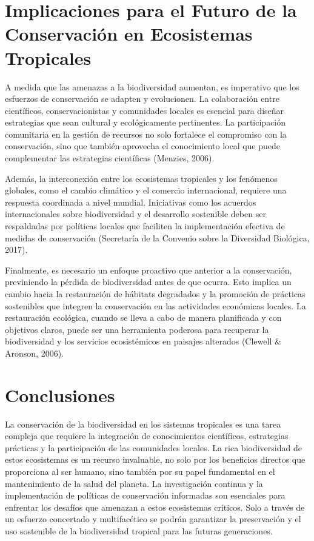 \documentclass[
  letterpaper,
  DIV=11,
  numbers=noendperiod,
  oneside]{scrreprt}
\begin{document}
\section{Implicaciones para el Futuro de la Conservación en Ecosistemas
Tropicales}\label{implicaciones-para-el-futuro-de-la-conservaciuxf3n-en-ecosistemas-tropicales}

A medida que las amenazas a la biodiversidad aumentan, es imperativo que
los esfuerzos de conservación se adapten y evolucionen. La colaboración
entre científicos, conservacionistas y comunidades locales es esencial
para diseñar estrategias que sean cultural y ecológicamente pertinentes.
La participación comunitaria en la gestión de recursos no solo fortalece
el compromiso con la conservación, sino que también aprovecha el
conocimiento local que puede complementar las estrategias científicas
(Menzies, 2006).

Además, la interconexión entre los ecosistemas tropicales y los
fenómenos globales, como el cambio climático y el comercio
internacional, requiere una respuesta coordinada a nivel mundial.
Iniciativas como los acuerdos internacionales sobre biodiversidad y el
desarrollo sostenible deben ser respaldadas por políticas locales que
faciliten la implementación efectiva de medidas de conservación
(Secretaría de la Convenio sobre la Diversidad Biológica, 2017).

Finalmente, es necesario un enfoque proactivo que anterior a la
conservación, previniendo la pérdida de biodiversidad antes de que
ocurra. Esto implica un cambio hacia la restauración de hábitats
degradados y la promoción de prácticas sostenibles que integren la
conservación en las actividades económicas locales. La restauración
ecológica, cuando se lleva a cabo de manera planificada y con objetivos
claros, puede ser una herramienta poderosa para recuperar la
biodiversidad y los servicios ecosistémicos en paisajes alterados
(Clewell \& Aronson, 2006).

\section{Conclusiones}\label{conclusiones-1}

La conservación de la biodiversidad en los sistemas tropicales es una
tarea compleja que requiere la integración de conocimientos científicos,
estrategias prácticas y la participación de las comunidades locales. La
rica biodiversidad de estos ecosistemas es un recurso invaluable, no
solo por los beneficios directos que proporciona al ser humano, sino
también por su papel fundamental en el mantenimiento de la salud del
planeta. La investigación continua y la implementación de políticas de
conservación informadas son esenciales para enfrentar los desafíos que
amenazan a estos ecosistemas críticos. Solo a través de un esfuerzo
concertado y multifacético se podrán garantizar la preservación y el uso
sostenible de la biodiversidad tropical para las futuras generaciones.
\end{document}

